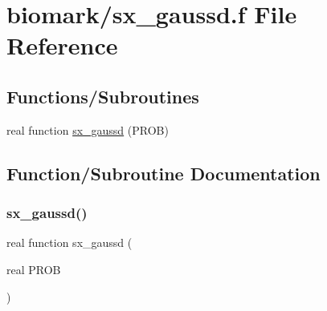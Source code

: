 \hypertarget{sx__gaussd_8f}{}\section{biomark/sx\+\_\+gaussd.f File Reference}
\label{sx__gaussd_8f}
\subsection*{Functions/\+Subroutines}
\begin{DoxyCompactItemize}
\item 
real function \hyperlink{sx__gaussd_8f_a6e30d8190176191c5222b9d704181541}{sx\+\_\+gaussd} (P\+R\+OB)
\end{DoxyCompactItemize}


\subsection{Function/\+Subroutine Documentation}
\mbox{\label{sx__gaussd_8f_a6e30d8190176191c5222b9d704181541}} 
\subsubsection{\texorpdfstring{sx\+\_\+gaussd()}{sx\_gaussd()}}
{\footnotesize\ttfamily real function sx\+\_\+gaussd (\begin{DoxyParamCaption}\item[{real}]{P\+R\+OB }\end{DoxyParamCaption})}

